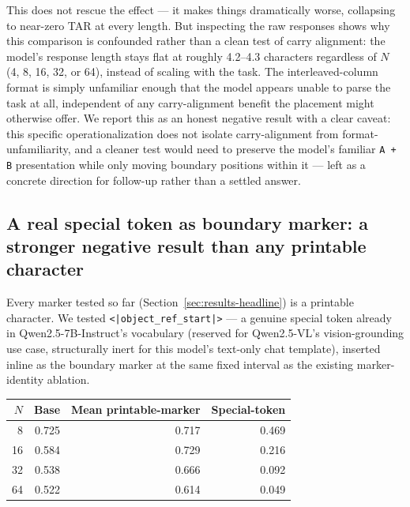 \documentclass[11pt]{article}
\begin{document}
This does not rescue the effect --- it makes things dramatically worse, collapsing to near-zero TAR at every length. But inspecting the raw responses shows why this comparison is confounded rather than a clean test of carry alignment: the model's response length stays flat at roughly 4.2--4.3 characters regardless of $N$ (4, 8, 16, 32, or 64), instead of scaling with the task. The interleaved-column format is simply unfamiliar enough that the model appears unable to parse the task at all, independent of any carry-alignment benefit the placement might otherwise offer. We report this as an honest negative result with a clear caveat: this specific operationalization does not isolate carry-alignment from format-unfamiliarity, and a cleaner test would need to preserve the model's familiar \texttt{A + B} presentation while only moving boundary positions within it --- left as a concrete direction for follow-up rather than a settled answer.

\subsection{A real special token as boundary marker: a stronger negative result than any printable character}

Every marker tested so far (Section~\ref{sec:results-headline}) is a printable character. We tested \texttt{<|object\_ref\_start|>} --- a genuine special token already in Qwen2.5-7B-Instruct's vocabulary (reserved for Qwen2.5-VL's vision-grounding use case, structurally inert for this model's text-only chat template), inserted inline as the boundary marker at the same fixed interval as the existing marker-identity ablation.

\begin{table}[htbp]
\centering
\small
\begin{tabular}{rrrr}
\toprule
$N$ & Base & Mean printable-marker & Special-token \\
\midrule
8  & 0.725 & 0.717 & 0.469 \\
16 & 0.584 & 0.729 & 0.216 \\
32 & 0.538 & 0.666 & 0.092 \\
64 & 0.522 & 0.614 & 0.049 \\
\bottomrule
\end{tabular}
\end{table}
\end{document}
